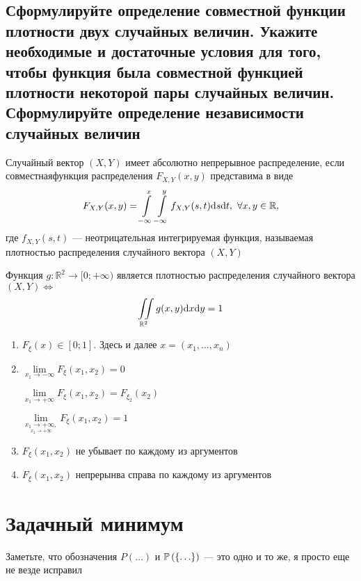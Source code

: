 \documentclass{article}
\begin{document}
\subsection{Сформулируйте определение совместной функции плотности двух случайных величин. Укажите необходимые и достаточные условия для того, чтобы функция была совместной функцией плотности некоторой пары случайных величин. Сформулируйте определение независимости случайных величин}
 Случайный вектор $(X,Y)$ имеет абсолютно непрерывное распределение, если совместнаяфункция распределения $F_{X,Y}(x,y)$ представима в виде
\begin{equation*}
    F_{X,Y}(x,y)=\int\limits_{-\infty}^{x}\int\limits_{-\infty}^{y} f_{X,Y}(s,t)\text{d}s\text{d}t,\ \forall x,y\in\mathbb{R},
\end{equation*}
где $f_{X,Y}(s,t)$ — неотрицательная интегрируемая функция, называемая плотностью распределения случайного вектора $(X,Y)$

\theorem Функция $g:\mathbb{R}^2\to[0;+\infty)$ является плотностью распределения случайного вектора $(X,Y)\Longleftrightarrow$
\begin{equation*}
    \iint\limits_{\mathbb{R}^2}g(x,y)\text{d}x\text{d}y=1
\end{equation*} 

\theorem
\begin{enumerate}
    \item $F_{\xi}(x)\in[0;1]$. Здесь и далее $x=(x_1,\ldots,x_n)$
    \item $\lim\limits_{x_1\rightarrow-\infty}F_{\xi}(x_1,x_2)=0$
    
    $\lim\limits_{x_1\rightarrow+\infty}F_{\xi}(x_1,x_2)=F_{\xi_2}(x_2)$

    $\lim\limits_{\underset{x_2\rightarrow+\infty}{x_1\rightarrow+\infty,}}F_{\xi}(x_1,x_2)=1$
    \item $F_{\xi}(x_1,x_2)$ не убывает по каждому из аргументов
    \item $F_{\xi}(x_1,x_2)$ непрерынва справа по каждому из аргументов
\end{enumerate}


\newpage
\section{Задачный минимум}
Заметьте, что обозначения $P(\ldots)$ и $\mathbb{P}\left(\{\ldots\}\right)$ — это одно и то же, я просто еще не везде исправил
    
\end{document}
